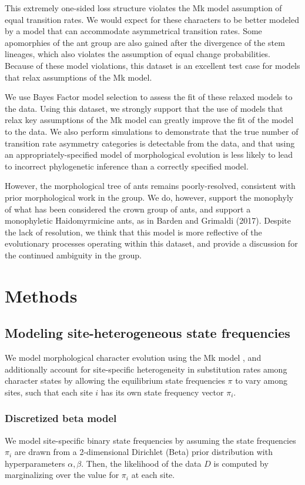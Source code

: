 \documentclass[]{article}
\begin{document}
This extremely one-sided loss structure violates the Mk model assumption of equal transition rates. 
We would expect for these characters to be better modeled by a model that can accommodate asymmetrical transition rates.
Some apomorphies of the ant group are also gained after the divergence of the stem lineages, which also violates the assumption of equal change probabilities.
Because of these model violations, this dataset is an excellent test case for models that relax assumptions of the Mk model. \par
We use Bayes Factor model selection to assess the fit of these relaxed models to the data.
Using this dataset, we strongly support that the use of models that relax key assumptions of the Mk model can greatly improve the fit of the model to the data.
We also perform simulations to demonstrate that the true number of transition rate asymmetry categories is detectable from the data, and that using an appropriately-specified model of morphological evolution is less likely to lead to incorrect phylogenetic inference than a correctly specified model.\par
However, the morphological tree of ants remains poorly-resolved, consistent with prior morphological work in the group.
We do, however, support the monophyly of what  has been considered the crown group of ants, and support a monophyletic Haidomyrmicine ants, as in Barden and Grimaldi (2017). 
Despite the lack of resolution, we think that this model is more reflective of the evolutionary processes operating within this dataset, and provide a discussion for the continued ambiguity in the group. \par

\section{Methods}

\subsection{Modeling site-heterogeneous state frequencies}

We model morphological character evolution using the Mk model \citep{lewis2001likelihood}, and additionally account for site-specific heterogeneity in substitution rates among character states by allowing the equilibrium state frequencies $\pi$ to vary among sites, such that each site $i$ has its own state frequency vector 
$\pi_i$.

\subsubsection{Discretized beta model}
We model site-specific binary state frequencies by assuming the state frequencies $\pi_i$ are drawn from a 2-dimensional Dirichlet (Beta) prior distribution with hyperparameters $\alpha,\beta$.
Then, the likelihood of the data $D$ is computed by marginalizing over the value for $\pi_i$ at each site.
\end{document}
